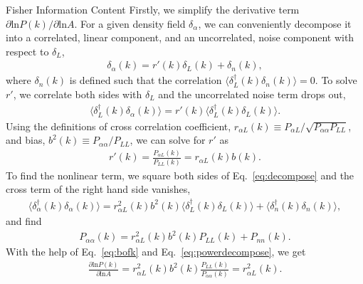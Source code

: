 \begin{section}{Fisher Information Content}
  Firstly, we simplify the derivative term
  $\partial \mathrm{ln} P(k)/\partial\mathrm{ln} A$.  For a given density field $\delta_\alpha$, we can
  conveniently decompose it into a correlated, linear component,
  and an uncorrelated, noise component with respect to $\delta_L$, 
  \begin{align}
    \delta_{\alpha}(k) = r'(k) \delta_L (k) + \delta_{n}(k),
    \label{eq:decompose}
  \end{align}
  where $\delta_{n}(k)$ is defined such that the correlation
  $\langle \delta_L^\dagger(k)\delta_{n}(k) \rangle=0$.  To solve $r'$, we correlate
  both sides with $\delta_L$ and the uncorrelated noise term drops out,
  \begin{align}
    \langle \delta_L^\dagger(k)\delta_\alpha(k) \rangle = r'(k) \langle \delta_L^\dagger(k)\delta_L(k) \rangle.
    \label{eq:correlating}
  \end{align} 
  Using the definitions of cross correlation coefficient, $r_{\alpha L}(k)\equiv P_{\alpha L}/\sqrt{P_{\alpha\alpha}P_{LL}}$,
  and bias, $b^2(k)\equiv P_{\alpha\alpha}/P_{LL}$, we can solve for $r'$ as
  \begin{align}
    r'(k) = \frac{P_{\alpha L}(k)}{P_{LL}(k)}=r_{\alpha L}(k) b(k).
    \label{eq:bofk}                                              
  \end{align}                                                    
  To find the nonlinear term, we square both sides of Eq.~\ref{eq:decompose}
  and the cross term of the right hand side vanishes,             
  \begin{align}                                                  
    \langle \delta_\alpha^\dagger(k) \delta_\alpha(k) \rangle =  
    r_{\alpha L}^2(k)b^2(k) \langle \delta_L^\dagger(k) \delta_L(k) \rangle + 
    \langle \delta_{n}^\dagger(k)\delta_{n}(k) \rangle,          
  \end{align}                                                    
  and find                                                       
  \begin{align}                                                  
    P_{\alpha\alpha}(k) = r_{\alpha L}^2(k)b^2(k)P_{LL}(k) + P_{nn}(k).
    \label{eq:powerdecompose}                                    
  \end{align}                                                    
  With the help of Eq.~\ref{eq:bofk} and Eq.~\ref{eq:powerdecompose},
  we get                                                         
  \begin{align}                                                  
    \frac{\partial \mathrm{ln} P(k) }{ \partial \mathrm{ln} A}=
    r^2_{\alpha L}(k)b^2(k)\frac{P_{LL}(k)}{P_{\alpha\alpha}(k)}=r^2_{\alpha L}(k).
  \end{align}


\end{section}
